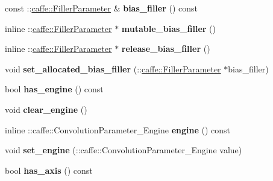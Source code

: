 \begin{DoxyCompactItemize}
const \+::\mbox{\hyperlink{classcaffe_1_1_filler_parameter}{caffe\+::\+Filler\+Parameter}} \& {\bfseries bias\+\_\+filler} () const
\item 
\mbox{\label{classcaffe_1_1_convolution_parameter_ac1d44697032acd36e146b115edc5570f}} 
inline \+::\mbox{\hyperlink{classcaffe_1_1_filler_parameter}{caffe\+::\+Filler\+Parameter}} $\ast$ {\bfseries mutable\+\_\+bias\+\_\+filler} ()
\item 
\mbox{\label{classcaffe_1_1_convolution_parameter_adf48ace6edd24d225191fa489ca5917e}} 
inline \+::\mbox{\hyperlink{classcaffe_1_1_filler_parameter}{caffe\+::\+Filler\+Parameter}} $\ast$ {\bfseries release\+\_\+bias\+\_\+filler} ()
\item 
\mbox{\label{classcaffe_1_1_convolution_parameter_a52277093d2b5bf97354751f5ba960fd9}} 
void {\bfseries set\+\_\+allocated\+\_\+bias\+\_\+filler} (\+::\mbox{\hyperlink{classcaffe_1_1_filler_parameter}{caffe\+::\+Filler\+Parameter}} $\ast$bias\+\_\+filler)
\item 
\mbox{\label{classcaffe_1_1_convolution_parameter_a8d65a155f4b446e5110da9a0d0c5e88f}} 
bool {\bfseries has\+\_\+engine} () const
\item 
\mbox{\label{classcaffe_1_1_convolution_parameter_ae0619b6f3bd68aa5d2c34828c1c58f51}} 
void {\bfseries clear\+\_\+engine} ()
\item 
\mbox{\label{classcaffe_1_1_convolution_parameter_a1411077bfb0327d0b1b68463d929cce8}} 
inline \+::caffe\+::\+Convolution\+Parameter\+\_\+\+Engine {\bfseries engine} () const
\item 
\mbox{\label{classcaffe_1_1_convolution_parameter_a833de60a3c86589b07584c1db34b7c03}} 
void {\bfseries set\+\_\+engine} (\+::caffe\+::\+Convolution\+Parameter\+\_\+\+Engine value)
\item 
\mbox{\label{classcaffe_1_1_convolution_parameter_ab803fcecd6ba366a5e9dfabb53e15aee}} 
bool {\bfseries has\+\_\+axis} () const

\end{DoxyCompactItemize}
